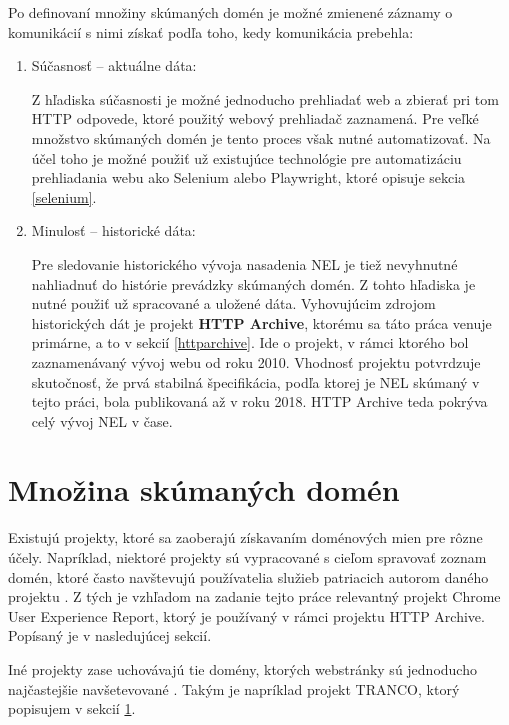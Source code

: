 Po definovaní množiny skúmaných domén je možné zmienené záznamy o komunikácií s nimi získať podľa toho, kedy komunikácia prebehla:
\begin{enumerate}
    \item Súčasnosť -- aktuálne dáta:
    
    Z hľadiska súčasnosti je možné jednoducho prehliadať web a zbierať pri tom HTTP odpovede, ktoré použitý webový prehliadač zaznamená. 
    Pre veľké množstvo skúmaných domén je tento proces však nutné automatizovať.
    Na účel toho je možné použiť už existujúce technológie pre automatizáciu prehliadania webu ako Selenium alebo Playwright, ktoré opisuje sekcia \ref{selenium}.

    \item Minulosť -- historické dáta:

    Pre sledovanie historického vývoja nasadenia NEL je tiež nevyhnutné nahliadnuť do histórie prevádzky skúmaných domén. 
    Z tohto hľadiska je nutné použiť už spracované a uložené dáta. 
    Vyhovujúcim zdrojom historických dát je projekt \textbf{HTTP Archive}, ktorému sa táto práca venuje primárne, a to v sekcií \ref{httparchive}.
    Ide o projekt, v rámci ktorého bol zaznamenávaný vývoj webu od roku 2010. Vhodnosť projektu potvrdzuje skutočnosť, že prvá stabilná špecifikácia, podľa ktorej je NEL skúmaný v tejto práci, bola publikovaná až v roku 2018. HTTP Archive teda pokrýva celý vývoj NEL v čase.
\end{enumerate}

\pagebreak

\section{Množina skúmaných domén}
\label{tranco}

Existujú projekty, ktoré sa zaoberajú získavaním doménových mien pre rôzne účely.
Napríklad, niektoré projekty sú vypracované s cieľom spravovať zoznam domén, ktoré často navštevujú používatelia služieb patriacich autorom daného projektu \cite{chrome-crux}. 
Z tých je vzhľadom na zadanie tejto práce relevantný projekt Chrome User Experience Report, ktorý je používaný v rámci projektu HTTP Archive. 
Popísaný je v nasledujúcej sekcií.

Iné projekty zase uchovávajú tie domény, ktorých webstránky sú jednoducho najčastejšie navšetevované \cite{hacker-target-website-lists-overview, tranco}.
Takým je napríklad projekt TRANCO, ktorý popisujem v sekcií \ref{tranco}.

